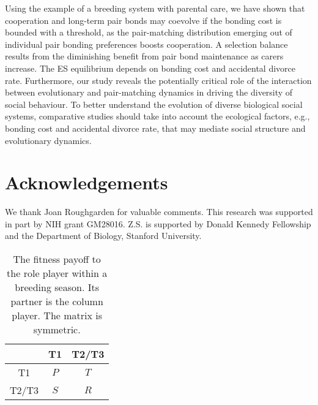 \documentclass[12pt]{article}
\begin{document}
Using the example of a breeding system with parental care, we have shown that cooperation and long-term pair bonds may coevolve if the bonding cost is bounded with a threshold, as the pair-matching distribution emerging out of individual pair bonding preferences boosts cooperation. A selection balance results from the diminishing benefit from pair bond maintenance as carers increase. The ES equilibrium depends on bonding cost and accidental divorce rate. Furthermore, our study reveals the potentially critical role of the interaction between evolutionary and pair-matching dynamics in driving the diversity of social behaviour. To better understand the evolution of diverse biological social systems, comparative studies should take into account the ecological factors, e.g., bonding cost and accidental divorce rate, that may mediate social structure and evolutionary dynamics.

\section*{Acknowledgements}

We thank Joan Roughgarden for valuable comments. This research was supported in part by NIH grant GM28016. Z.S. is supported by Donald Kennedy Fellowship and the Department of Biology, Stanford University.




\clearpage
\begin{table*}
		\centering
		\caption{The fitness payoff to the role player within a breeding season. Its partner is the column player. The matrix is symmetric.}
		\begin{tabular}[htb]{ccc} \hline
		  & T1 & T2/T3 \\ \hline
		T1 & $P$ & $T$ \\
		T2/T3 & $S$ & $R$ \\
		\hline
		\end{tabular}
		\label{tab:Payoff}
\end{table*}
\end{document}
